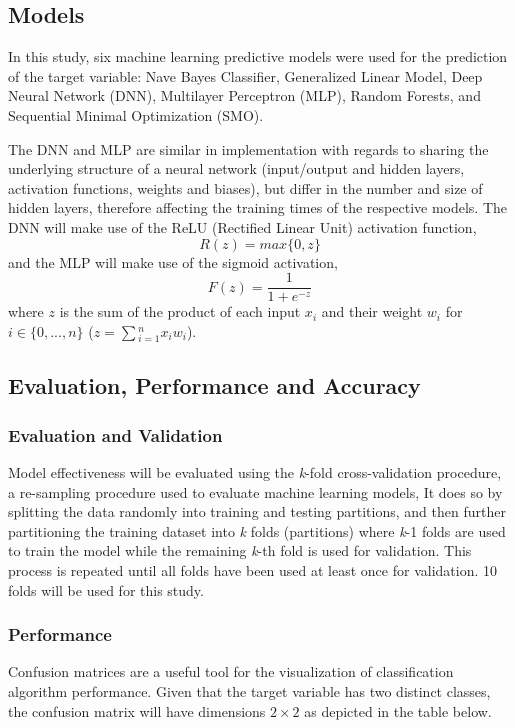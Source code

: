 \documentclass[conference]{IEEEtran}
\begin{document}
\subsection{Models}
In this study, six machine learning predictive models were used for the prediction of the target variable: Nave Bayes Classifier, Generalized Linear Model, Deep Neural Network (DNN), Multilayer Perceptron (MLP), Random Forests, and Sequential Minimal Optimization (SMO).

The DNN and MLP are similar in implementation with regards to sharing the underlying structure of a neural network (input/output and hidden layers, activation functions, weights and biases), but differ in the number and size of hidden layers, therefore affecting the training times of the respective models. The DNN will make use of the ReLU (Rectified Linear Unit) activation function,
\begin{equation}
R(z)=max\{0,z\}
\end{equation}
and the MLP will make use of the sigmoid activation,
\begin{equation}
F(z)=\frac{1}{1+e^{-z}}
\end{equation}
where \(z\) is the sum of the product of each input \(x_i\) and their weight \(w_i\) for \(i \in \{0,...,n\}\) (\(z=\sum{_{i=1}^n}{x_i w_i}\)).

\subsection{Evaluation, Performance and Accuracy}

\subsubsection{Evaluation and Validation}
Model effectiveness will be evaluated using the \textit{k}-fold cross-validation procedure, a re-sampling procedure used to evaluate machine learning models, It does so by splitting the data randomly into training and testing partitions, and then further partitioning the training dataset into \textit{k} folds (partitions) where \textit{k}-1 folds are used to train the model while the remaining \textit{k}-th fold is used for validation. This process is repeated until all folds have been used at least once for validation. 10 folds will be used for this study.

\subsubsection{Performance}
Confusion matrices are a useful tool for the visualization of classification algorithm performance. Given that the target variable has two distinct classes, the confusion matrix will have dimensions \(2 \times 2\) as depicted in the table below.
\end{document}
